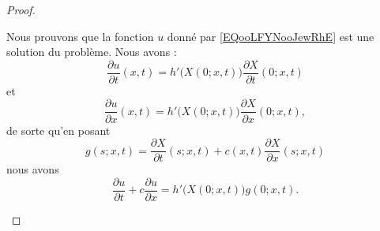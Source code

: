 \begin{proof}
\begin{subproof}
\begin{subproof}
			Nous prouvons que la fonction \( u\) donné par \eqref{EQooLFYNooJewRhE} est une solution du problème. Nous avons :
			\begin{equation}
				\frac{ \partial u }{ \partial t }(x,t)=h'\big( X(0;x,t) \big)\frac{ \partial X }{ \partial t }(0;x,t)
			\end{equation}
			et
			\begin{equation}
				\frac{ \partial u }{ \partial x }(x,t)=h'\big( X(0;x,t) \big)\frac{ \partial X }{ \partial x }(0;x,t),
			\end{equation}
			de sorte qu'en posant
			\begin{equation}
				g(s;x,t)=\frac{ \partial X }{ \partial t }(s;x,t)+c(x,t)\frac{ \partial X }{ \partial x }(s;x,t)
			\end{equation}
			nous avons
			\begin{equation}
				\frac{ \partial u }{ \partial t }+c\frac{ \partial u }{ \partial x }=h'\big( X(0;x,t) \big)g(0;x,t).
			\end{equation}



\end{subproof}
\end{subproof}
\end{proof}
